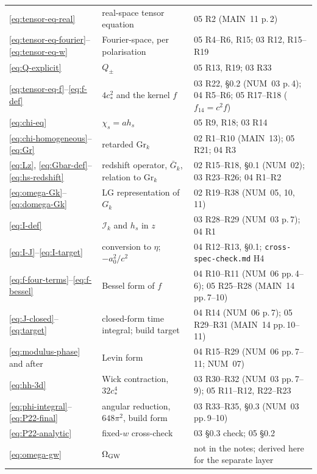 \documentclass[11pt,a4paper]{article}
\newcommand{\Gr}{\mathrm{Gr}}
\newcommand{\Gb}{\bar{G}}
\newcommand{\cstar}{c_{*}}
\newcommand{\spec}[1]{\textsf{#1}}
\newcommand{\note}[1]{\textsf{#1}}
\theoremstyle{remark}
\begin{document}
\begin{longtable}{p{2.2cm}p{5.8cm}p{6.8cm}}
\eqref{eq:tensor-eq-real} & real-space tensor equation & \spec{05 R2} (\note{MAIN}~11 p.\,2) \\
\eqref{eq:tensor-eq-fourier}--\eqref{eq:tensor-eq-w} & Fourier-space, per polarisation & \spec{05 R4--R6, R15}; \spec{03 R12, R15--R19} \\
\eqref{eq:Q-explicit} & $Q_\pm$ & \spec{05 R13, R19}; \spec{03 R33} \\
\eqref{eq:tensor-eq-f}--\eqref{eq:f-def} & $4\cstar^2$ and the kernel $f$ & \spec{03 R22, \S0.2} (\note{NUM}~03 p.\,4); \spec{04 R5--R6}; \spec{05 R17--R18} ($f_{14} = c^2f$) \\
\eqref{eq:chi-eq} & $\chi_s = ah_s$ & \spec{05 R9, R18}; \spec{03 R14} \\
\eqref{eq:chi-homogeneous}--\eqref{eq:Gr} & retarded $\Gr_k$ & \spec{02 R1--R10} (\note{MAIN}~13); \spec{05 R21}; \spec{04 R3} \\
\eqref{eq:Lz}, \eqref{eq:Gbar-def}--\eqref{eq:hs-redshift} & redshift operator, $\Gb_k$, relation to $\Gr_k$ & \spec{02 R15--R18, \S0.1} (\note{NUM}~02); \spec{03 R23--R26}; \spec{04 R1--R2} \\
\eqref{eq:omega-Gk}--\eqref{eq:domega-Gk} & LG representation of $G_k$ & \spec{02 R19--R38} (\note{NUM}~05, 10, 11) \\
\eqref{eq:I-def} & $\mathcal{I}_k$ and $h_s$ in $z$ & \spec{03 R28--R29} (\note{NUM}~03 p.\,7); \spec{04 R1} \\
\eqref{eq:I-J}--\eqref{eq:I-target} & conversion to $\eta$; $-a_0^2/c^2$ & \spec{04 R12--R13, \S0.1}; \texttt{cross-spec-check.md} H4 \\
\eqref{eq:f-four-terms}--\eqref{eq:f-bessel} & Bessel form of $f$ & \spec{04 R10--R11} (\note{NUM}~06 pp.\,4--6); \spec{05 R25--R28} (\note{MAIN}~14 pp.\,7--10) \\
\eqref{eq:J-closed}--\eqref{eq:target} & closed-form time integral; build target & \spec{04 R14} (\note{NUM}~06 p.\,7); \spec{05 R29--R31} (\note{MAIN}~14 pp.\,10--11) \\
\eqref{eq:modulus-phase} and after & Levin form & \spec{04 R15--R29} (\note{NUM}~06 pp.\,7--11; \note{NUM}~07) \\
\eqref{eq:hh-3d} & Wick contraction, $32\cstar^4$ & \spec{03 R30--R32} (\note{NUM}~03 pp.\,7--9); \spec{05 R11--R12, R22--R23} \\
\eqref{eq:phi-integral}--\eqref{eq:P22-final} & angular reduction, $648\pi^2$, build form & \spec{03 R33--R35, \S0.3} (\note{NUM}~03 pp.\,9--10) \\
\eqref{eq:P22-analytic} & fixed-$w$ cross-check & \spec{03 \S0.3} check; \spec{05 \S0.2} \\
\eqref{eq:omega-gw} & $\Omega_{\rm GW}$ & not in the notes; derived here for the separate layer \\
\bottomrule
\end{longtable}
\end{document}
